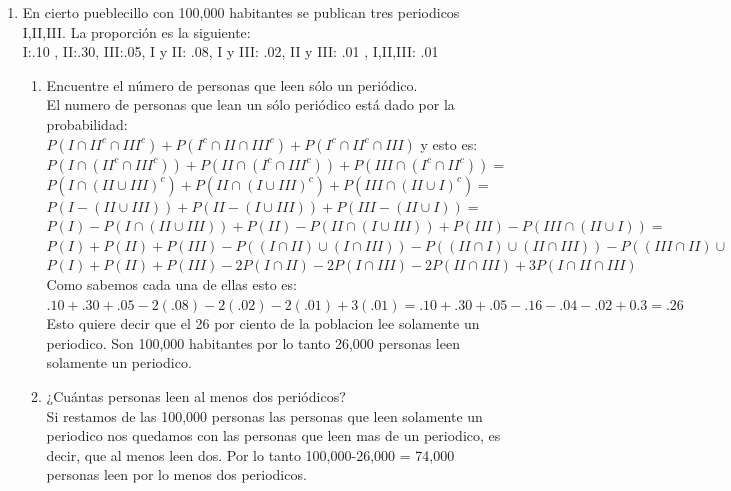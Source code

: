 \documentclass[12pt,a4paper]{report}
\begin{document}
\begin{enumerate}
   \item {
    En cierto pueblecillo con 100,000 habitantes se publican tres periodicos I,II,III. La proporción es la siguiente:\\
I:.10 , II:.30, III:.05, I y II: .08, I y III: .02, II y III: .01 , I,II,III: .01
	\begin{enumerate}[label=\alph*) ]
   \item {
   Encuentre el número de personas que leen sólo un periódico.\\
	El numero de personas que lean un sólo periódico está dado por la probabilidad:\\
	$P(I \cap II^c\cap III^c)+P(I^c \cap II\cap III^c)+P(I^c \cap II^c\cap III)$ y esto es:\\
	$P(I \cap( II^c \cap III^c))+ P(II\cap(I^c \cap III^c))+P(III \cap (I^c \cap II^c))=$ \\
	$P(I \cap (II \cup III)^c)+P(II \cap (I \cup III)^c)+P(III \cap (II \cup I)^c)=$\\
	$P(I-(II\cup III))+P(II-(I \cup III))+P(III-(II \cup I))=$\\
	$P(I)-P(I \cap (II \cup III))+P(II)-P(II \cap (I \cup III))+P(III)-P(III\cap (II\cup I))=$ \\
	$P(I)+P(II)+P(III)-P((I\cap II)\cup(I \cap III))-P((II\cap I)\cup(II \cap III))-P((III\cap II)\cup(III \cap I))=$\\
	$P(I)+P(II)+P(III)-2P(I\cap II)-2P(I\cap III)-2P(II \cap III)+3P(I\cap II \cap III)$ \\
	Como sabemos cada una de ellas esto es:\\
	$.10+.30+.05-2(.08)-2(.02)-2(.01)+3(.01)=.10+.30+.05-.16-.04-.02+0.3=.26$\\
	Esto quiere decir que el 26 por ciento de la poblacion lee solamente un periodico. Son 100,000 habitantes por lo tanto 26,000 personas leen solamente un periodico.
   }

   \item {
   ¿Cuántas personas leen al menos dos periódicos?\\
   Si restamos de las 100,000 personas las personas que leen solamente un periodico nos quedamos con las personas que leen mas de un periodico, es decir, que al menos leen dos. Por lo tanto 100,000-26,000 = 74,000 personas leen por lo menos dos periodicos.

   }


\end{enumerate}}
\end{enumerate}
\end{document}
